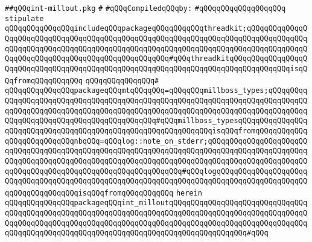 \label{src/lib/x-kit/widget/edit/int-millout.pkg}
\verb|##qQQqint-millout.pkg|\newline
\verb|#|\newline
\newline
\verb|#qQQqCompiledqQQqby:|\newline
\verb|#qQQqqQQqqQQqqQQqqQQq|\newline
\newline
\newline
\verb|stipulate|\newline
\verb|qQQqqQQqqQQqqQQqincludeqQQqpackageqQQqqQQqqQQqthreadkit;qQQqqQQqqQQqqQQqqQQqqQQqqQQqqQQqqQQqqQQqqQQqqQQqqQQqqQQqqQQqqQQqqQQqqQQqqQQqqQQqqQQqqQQqqQQqqQQqqQQqqQQqqQQqqQQqqQQqqQQqqQQqqQQqqQQqqQQqqQQqqQQqqQQqqQQqqQQqqQQqqQQqqQQqqQQqqQQqqQQqqQQqqQQqqQQq#qQQqthreadkitqQQqqQQqqQQqqQQqqQQqqQQqqQQqqQQqqQQqqQQqqQQqqQQqqQQqqQQqqQQqqQQqqQQqqQQqqQQqqQQqqQQqisqQQqfromqQQqqQQqqQQq|\newline
\verb|qQQqqQQqqQQqqQQq#|\newline
\verb|qQQqqQQqqQQqqQQqpackageqQQqmtqQQqqQQq=qQQqqQQqmillboss_types;qQQqqQQqqQQqqQQqqQQqqQQqqQQqqQQqqQQqqQQqqQQqqQQqqQQqqQQqqQQqqQQqqQQqqQQqqQQqqQQqqQQqqQQqqQQqqQQqqQQqqQQqqQQqqQQqqQQqqQQqqQQqqQQqqQQqqQQqqQQqqQQqqQQqqQQqqQQqqQQqqQQqqQQqqQQqqQQqqQQqqQQq#qQQqmillboss_typesqQQqqQQqqQQqqQQqqQQqqQQqqQQqqQQqqQQqqQQqqQQqqQQqqQQqqQQqqQQqqQQqisqQQqfromqQQqqQQqqQQq|\newline
\newline
\verb|qQQqqQQqqQQqqQQqnbqQQq=qQQqlog::note_on_stderr;qQQqqQQqqQQqqQQqqQQqqQQqqQQqqQQqqQQqqQQqqQQqqQQqqQQqqQQqqQQqqQQqqQQqqQQqqQQqqQQqqQQqqQQqqQQqqQQqqQQqqQQqqQQqqQQqqQQqqQQqqQQqqQQqqQQqqQQqqQQqqQQqqQQqqQQqqQQqqQQqqQQqqQQqqQQqqQQqqQQqqQQqqQQqqQQqqQQqqQQqqQQq#qQQqlogqQQqqQQqqQQqqQQqqQQqqQQqqQQqqQQqqQQqqQQqqQQqqQQqqQQqqQQqqQQqqQQqqQQqqQQqqQQqqQQqqQQqqQQqqQQqqQQqqQQqqQQqqQQqisqQQqfromqQQqqQQqqQQq|\newline
\verb|herein|\newline
\newline
\verb|qQQqqQQqqQQqqQQqpackageqQQqint_milloutqQQqqQQqqQQqqQQqqQQqqQQqqQQqqQQqqQQqqQQqqQQqqQQqqQQqqQQqqQQqqQQqqQQqqQQqqQQqqQQqqQQqqQQqqQQqqQQqqQQqqQQqqQQqqQQqqQQqqQQqqQQqqQQqqQQqqQQqqQQqqQQqqQQqqQQqqQQqqQQqqQQqqQQqqQQqqQQqqQQqqQQqqQQqqQQqqQQqqQQqqQQqqQQqqQQqqQQqqQQqqQQqqQQq#qQQq|\newline
